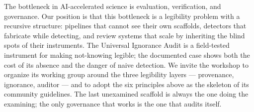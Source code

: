 \documentclass{article}
\begin{document}
The bottleneck in AI-accelerated science is evaluation, verification, and governance. Our position is that this bottleneck is a legibility problem with a recursive structure: pipelines that cannot see their own scaffolds, detectors that fabricate while detecting, and review systems that scale by inheriting the blind spots of their instruments. The Universal Ignorance Audit is a field-tested instrument for making not-knowing legible; the documented case shows both the cost of its absence and the danger of naive detection. We invite the workshop to organize its working group around the three legibility layers --- provenance, ignorance, auditor --- and to adopt the six principles above as the skeleton of its community guidelines. The last unexamined scaffold is always the one doing the examining; the only governance that works is the one that audits itself.
\end{document}
